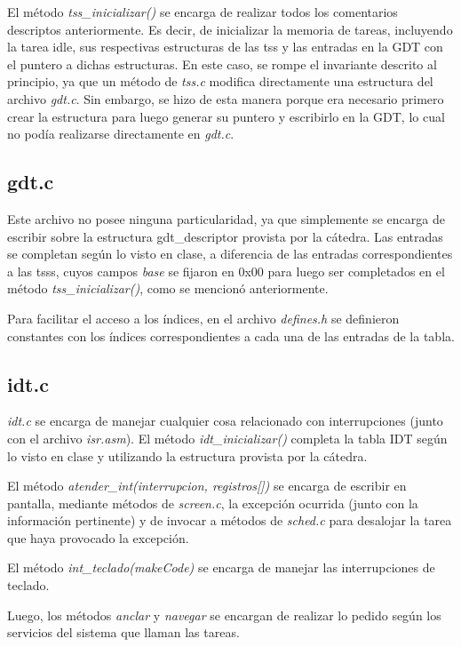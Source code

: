 \documentclass[a4paper]{article}
\begin{document}
El método \textit{tss_inicializar()} se encarga de realizar todos los comentarios descriptos anteriormente. Es decir, de inicializar la memoria de tareas, incluyendo la tarea idle, sus respectivas estructuras de las tss y las entradas en la GDT con el puntero a dichas estructuras. En este caso, se rompe el invariante descrito al principio, ya que un método de \textit{tss.c} modifica directamente una estructura del archivo \textit{gdt.c}. Sin embargo, se hizo de esta manera porque era necesario primero crear la estructura para luego generar su puntero y escribirlo en la GDT, lo cual no podía realizarse directamente en \textit{gdt.c}.

\subsection{gdt.c}
Este archivo no posee ninguna particularidad, ya que simplemente se encarga de escribir sobre la estructura gdt_descriptor provista por la cátedra. Las entradas se completan según lo visto en clase, a diferencia de las entradas correspondientes a las tsss, cuyos campos \textit{base} se fijaron en 0x00 para luego ser completados en el método \textit{tss_inicializar()}, como se mencionó anteriormente.

Para facilitar el acceso a los índices, en el archivo \textit{defines.h} se definieron constantes con los índices correspondientes a cada una de las entradas de la tabla.

\subsection{idt.c}
\textit{idt.c} se encarga de manejar cualquier cosa relacionado con interrupciones (junto con el archivo \textit{isr.asm}). El método \textit{idt_inicializar()} completa la tabla IDT según lo visto en clase y utilizando la estructura provista por la cátedra.

El método \textit{atender_int(interrupcion, registros[])} se encarga de escribir en pantalla, mediante métodos de \textit{screen.c}, la excepción ocurrida (junto con la información pertinente) y de invocar a métodos de \textit{sched.c} para desalojar la tarea que haya provocado la excepción.

El método \textit{int_teclado(makeCode)} se encarga de manejar las interrupciones de teclado.

Luego, los métodos \textit{anclar} y \textit{navegar} se encargan de realizar lo pedido según los servicios del sistema que llaman las tareas.
\end{document}
